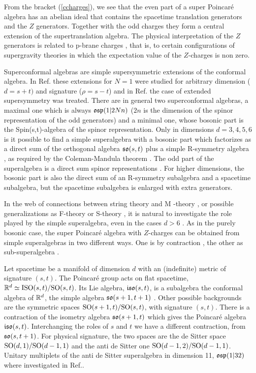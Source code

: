 \documentclass[a4paper,12pt]{article}
\begin{document}
From the bracket (\ref{ccharges}), we see that  the even part of a
super Poincar\'e algebra has  an abelian ideal that contains the
spacetime translation generators and the $Z$ generators. Together
with the odd charges they form a central extension of the
supertranslation algebra. The physical interpretation of the $Z$
generators is related to p-brane charges \cite{du,gt}, that is, to
certain configurations of supergravity theories in which the
expectation value of the $Z$-charges is non zero.

Superconformal algebras are simple supersymmetric extensions of
the conformal algebra. In Ref.\cite{dflv} these extensions for
$N=1$ were studied for arbitrary dimension ($d=s+t)$ and signature
($\rho=s-t$) and in Ref.\cite{dfl} the case of extended
supersymmetry was treated. There are in general two superconformal
algebras, a maximal one which is always $\mathfrak{osp}(1|2Nn)$ ($2n$ is
the dimension of the spinor representation of the odd generators)
and a minimal one, whose bosonic part is the Spin(s,t)-algebra of
the spinor representation. Only in  dimensions $d=3,4,5,6$ is it
possible to find a simple superalgebra with a bosonic part which
factorizes as a direct sum of the orthogonal algebra $\mathfrak{so}(s,t)$
 plus a simple  R-symmetry algebra \cite{na}, as required
by the Coleman-Mandula theorem \cite{cm}. The odd part of the
superalgebra is a direct sum spinor representations  \cite{hls}.
For higher dimensions, the bosonic part is also the direct sum of
an R-symmetry subalgebra and a spacetime subalgebra, but the
spacetime subalgebra is enlarged with extra generators.

 In the web of connections between
string theory and M -theory \cite{wi}, or possible generalizations
as F-theory \cite{va} or S-theory \cite{ba}, it is natural to
investigate the role played by the simple superalgebra,  even in
the cases $d>6$ \cite{dflv,dfl,to,to2,ho,bvp}. As in the purely
bosonic case, the super Poincar\'e algebra with $Z$-charges can be
obtained from simple superalgebras in two different ways. One is
by contraction \cite{df}, the other as sub-superalgebra
\cite{to,to2}.


Let spacetime be  a manifold of dimension $d$ with an (indefinite)
metric of signature $(s,t)$. The Poincar\'e group acts on flat
spacetime, $\R^d\simeq \break{\rm ISO}(s,t)/{\rm SO}(s,t)$. Its
Lie algebra, $\mathfrak{iso}(s,t)$, is a subalgebra the conformal algebra
of $\mathbb{R}^d$, the simple algebra $\mathfrak{so}(s+1,t+1)$ \cite{affs}. Other
possible backgrounds are the symmetric spaces ${\rm
SO}(s+1,t)/{\rm SO}(s,t)$, with signature $(s,t)$. There is a
contraction of the isometry algebra $\mathfrak{so}(s+1,t)$ which gives the
Poincar\'e algebra $\mathfrak{iso}(s,t)$. Interchanging the roles of $s$
and $t$ we have a different contraction, from $\mathfrak{so}(s,t+1)$. For
physical signature, the two spaces are  the de Sitter space ${\rm
SO}(d,1)/{\rm SO}(d-1,1)$ and the anti de Sitter one ${\rm
SO}(d-1,2)/{\rm SO}(d-1,1)$. Unitary multiplets of the anti de
Sitter superalgebra in dimension 11, $\mathfrak{osp}(1|32)$ where
investigated in Ref.\cite{gu}.
\end{document}
